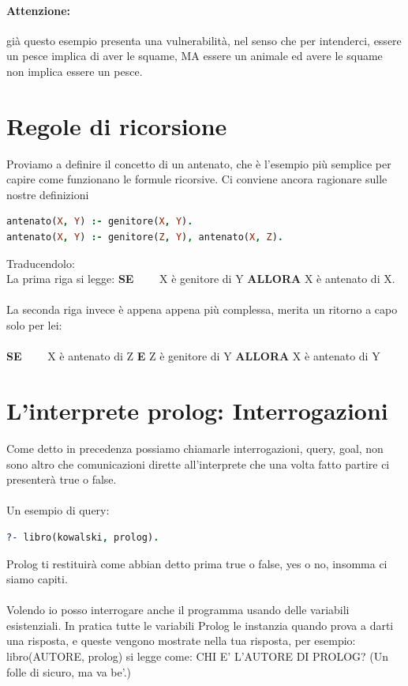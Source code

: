 \documentclass[12pt, a4paper, openany, oneside]{book}
\begin{document}
\paragraph{Attenzione: } già questo esempio presenta una vulnerabilità, nel senso
che per intenderci, essere un pesce implica di aver le squame, MA essere un 
animale ed avere le squame non implica essere un pesce.
\section{Regole di ricorsione}
Proviamo a definire il concetto di un antenato, che è l'esempio più semplice 
per capire come funzionano le formule ricorsive. Ci conviene ancora ragionare 
sulle nostre definizioni
\begin{lstlisting}[language = Prolog]
antenato(X, Y) :- genitore(X, Y).
antenato(X, Y) :- genitore(Z, Y), antenato(X, Z).
\end{lstlisting}
Traducendolo: \\
La prima riga si legge: \textbf{SE}~~~~ X è \color{red}genitore \color{black} di Y
\textbf{ALLORA} X è \color{red}antenato \color{black} di X. \\ \\
La seconda riga invece è appena appena più complessa, merita un ritorno a capo 
solo per lei: \\ \\
\textbf{SE}~~~~ X è \color{red}antenato \color{black} di Z \textbf{E} Z 
è \color{red}genitore \color{black} di Y \textbf{ALLORA} X è \color{red}antenato
\color{black} di Y
\section{L'interprete prolog: Interrogazioni}
Come detto in precedenza possiamo chiamarle interrogazioni, query, goal, non sono
altro che comunicazioni dirette all'interprete che una volta fatto partire ci 
presenterà true o false. \\ \\
Un esempio di query:\\ 
\begin{lstlisting}[language = Prolog]
?- libro(kowalski, prolog).
\end{lstlisting}
Prolog ti restituirà come abbian detto prima true o false, yes o no, insomma ci
siamo capiti.
\\ \\
Volendo io posso interrogare anche il programma usando delle variabili esistenziali.
In pratica tutte le variabili Prolog le instanzia quando prova a darti una risposta,
e queste vengono mostrate nella tua risposta, per esempio:\\
libro(AUTORE, prolog) si legge come: CHI E' L'AUTORE DI PROLOG? 
(Un folle di sicuro, ma va be'.) \\ \\
\end{document}
